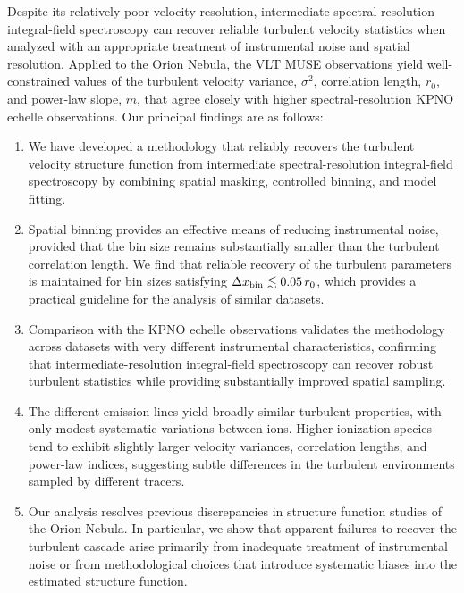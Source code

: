 \documentclass[fleqn,usenatbib, useAMS, a4paper]{mnras}
\begin{document}
Despite its relatively poor velocity resolution, intermediate
spectral-resolution integral-field spectroscopy can recover reliable
turbulent velocity statistics when analyzed with an appropriate
treatment of instrumental noise and spatial resolution. Applied to
the Orion Nebula, the VLT MUSE observations yield well-constrained
values of the turbulent velocity variance, \(\sigma^2\), correlation length, \(r_0\), and
power-law slope, \(m\), that agree closely with higher spectral-resolution
KPNO echelle observations. Our principal findings are as follows:

\begin{enumerate}[1.]

\item We have developed a methodology that reliably recovers the
turbulent velocity structure function from intermediate
spectral-resolution integral-field spectroscopy by combining spatial
masking, controlled binning, and model fitting.

\item Spatial binning provides an effective means of reducing
instrumental noise, provided that the bin size remains substantially
smaller than the turbulent correlation length. We find that reliable
recovery of the turbulent parameters is maintained for bin sizes
satisfying \(\Delta x_{\rm bin} \lesssim 0.05\,r_0\),
which provides a practical guideline for the analysis of similar
datasets.

\item Comparison with the KPNO echelle observations validates the
methodology across datasets with very different instrumental
characteristics, confirming that intermediate-resolution
integral-field spectroscopy can recover robust turbulent statistics
while providing substantially improved spatial sampling.

\item The different emission lines yield broadly similar turbulent
properties, with only modest systematic variations between ions.
Higher-ionization species tend to exhibit slightly larger velocity
variances, correlation lengths, and power-law indices, suggesting
subtle differences in the turbulent environments sampled by
different tracers.

\item Our analysis resolves previous discrepancies in structure
function studies of the Orion Nebula. In particular, we show that
apparent failures to recover the turbulent cascade arise primarily
from inadequate treatment of instrumental noise or from
methodological choices that introduce systematic biases into the
estimated structure function.

\end{enumerate}
\end{document}
